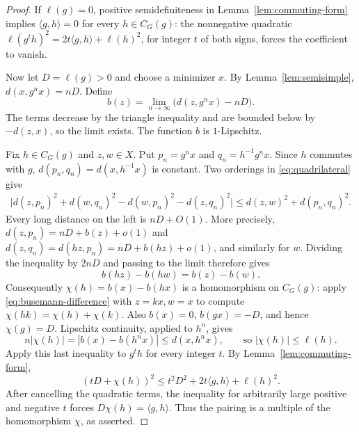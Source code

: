 \begin{proof}
If $\ell(g)=0$, positive semidefiniteness in
Lemma~\ref{lem:commuting-form} implies $\langle g,h\rangle=0$ for every
$h\in C_G(g)$: the nonnegative quadratic
$\ell(g^t h)^2=2t\langle g,h\rangle+\ell(h)^2$, for integer $t$ of
both signs, forces the coefficient to vanish.

Now let $D=\ell(g)>0$ and choose a minimizer $x$.  By
Lemma~\ref{lem:semisimple}, $d(x,g^n x)=nD$.  Define
\[
 b(z)=\lim_{n\to\infty}\bigl(d(z,g^n x)-nD\bigr).
\]
The terms decrease by the triangle inequality and are bounded below by
$-d(z,x)$, so the limit exists.  The function $b$ is $1$-Lipschitz.

Fix $h\in C_G(g)$ and $z,w\in X$.  Put
$p_n=g^n x$ and $q_n=h^{-1}g^n x$.  Since $h$ commutes with $g$,
$d(p_n,q_n)=d(x,h^{-1}x)$ is constant.  Two orderings in
\eqref{eq:quadrilateral} give
\begin{align*}
 \bigl|d(z,p_n)^2+d(w,q_n)^2-d(w,p_n)^2-d(z,q_n)^2\bigr|
 \le d(z,w)^2+d(p_n,q_n)^2.
\end{align*}
Every long distance on the left is $nD+O(1)$.  More precisely,
$d(z,p_n)=nD+b(z)+o(1)$ and
$d(z,q_n)=d(hz,p_n)=nD+b(hz)+o(1)$, and similarly for $w$.
Dividing the inequality by $2nD$ and passing to the limit therefore gives
\begin{equation}\label{eq:busemann-difference}
 b(hz)-b(hw)=b(z)-b(w).
\end{equation}
Consequently $\chi(h)=b(x)-b(hx)$ is a homomorphism on $C_G(g)$:
apply \eqref{eq:busemann-difference} with $z=kx,w=x$ to compute
$\chi(hk)=\chi(h)+\chi(k)$.  Also $b(x)=0$, $b(gx)=-D$, and hence
$\chi(g)=D$.  Lipschitz continuity, applied to $h^n$, gives
\[
 n|\chi(h)|=|b(x)-b(h^n x)|\le d(x,h^n x),
 \qquad\text{so } |\chi(h)|\le\ell(h).
\]
Apply this last inequality to $g^t h$ for every integer $t$.  By
Lemma~\ref{lem:commuting-form},
\[
 (tD+\chi(h))^2
 \le t^2D^2+2t\langle g,h\rangle+\ell(h)^2.
\]
After cancelling the quadratic terms, the inequality for arbitrarily
large positive and negative $t$ forces
$D\chi(h)=\langle g,h\rangle$.  Thus the pairing is a multiple of the
homomorphism $\chi$, as asserted.
\end{proof}
